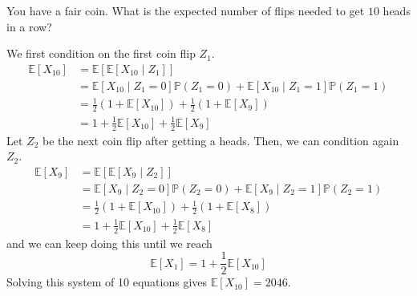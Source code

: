 	\begin{exercise}
	  \label{ex:expected-number-of-flips-to-get-10-heads-in-a}
		You have a fair coin. What is the expected number of flips needed to get $10$ heads in a row? 
	\end{exercise}
	\begin{solution}
		We first condition on the first coin flip $Z_1$. 
		\begin{align}
			\mathbb{E}[X_{10}] & = \mathbb{E}[\mathbb{E}[X_{10} \mid Z_1]] \\ 
												 & = \mathbb{E}[X_{10} \mid Z_1 = 0] \mathbb{P}(Z_1 = 0) + \mathbb{E}[X_{10} \mid Z_1 = 1] \mathbb{P}(Z_1 = 1) \\ 
												 & = \frac{1}{2} (1 + \mathbb{E}[X_{10}]) + \frac{1}{2} (1 + \mathbb{E}[X_9]) \\ 
												 & = 1 + \frac{1}{2} \mathbb{E}[X_{10}] + \frac{1}{2} \mathbb{E}[X_9] 
		\end{align}
		Let $Z_2$ be the next coin flip after getting a heads. Then, we can condition again $Z_2$. 
		\begin{align}
			\mathbb{E}[X_{9}]  & = \mathbb{E}[\mathbb{E}[X_{9} \mid Z_2]] \\ 
												 & = \mathbb{E}[X_{9} \mid Z_2 = 0] \mathbb{P}(Z_2 = 0) + \mathbb{E}[X_{9} \mid Z_2 = 1] \mathbb{P}(Z_2 = 1) \\ 
												 & = \frac{1}{2} (1 + \mathbb{E}[X_{10}]) + \frac{1}{2} (1 + \mathbb{E}[X_8]) \\ 
												 & = 1 + \frac{1}{2} \mathbb{E}[X_{10}] + \frac{1}{2} \mathbb{E}[X_8] 
		\end{align}
		and we can keep doing this until we reach 
		\begin{equation}
			\mathbb{E}[X_1] = 1 + \frac{1}{2} \mathbb{E}[X_{10}]
		\end{equation}
		Solving this system of 10 equations gives $\mathbb{E}[X_{10}] = 2046$. 
	\end{solution}


